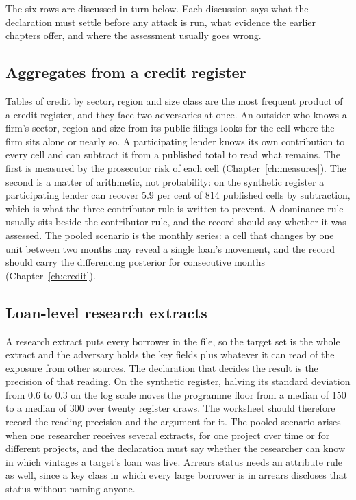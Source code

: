 The six rows are discussed in turn below. Each discussion says what the declaration
must settle before any attack is run, what evidence the earlier chapters offer, and
where the assessment usually goes wrong.

\subsection*{Aggregates from a credit register}

Tables of credit by sector, region and size class are the most frequent product of a
credit register, and they face two adversaries at once. An outsider who knows a
firm's sector, region and size from its public filings looks for the cell where the
firm sits alone or nearly so. A participating lender knows its own contribution to
every cell and can subtract it from a published total to read what remains. The
first is measured by the prosecutor risk of each cell (Chapter~\ref{ch:measures}). The
second is a matter of arithmetic, not probability: on the synthetic register a
participating lender can recover 5.9 per cent of 814 published cells by subtraction,
which is what the three-contributor rule is written to prevent. A dominance rule
usually sits beside the contributor rule, and the record should say whether it was
assessed. The pooled scenario is the monthly series: a cell that changes by one unit
between two months may reveal a single loan's movement, and the record should carry
the differencing posterior for consecutive months (Chapter~\ref{ch:credit}).

\subsection*{Loan-level research extracts}

A research extract puts every borrower in the file, so the target set is the whole
extract and the adversary holds the key fields plus whatever it can read of the
exposure from other sources. The declaration that decides the result is the
precision of that reading. On the synthetic register, halving its standard deviation
from 0.6 to 0.3 on the log scale moves the programme floor from a median of 150 to a
median of 300 over twenty register draws.
The worksheet should therefore record the reading precision and the argument for it.
The pooled scenario arises when one researcher receives several extracts, for one
project over time or for different projects, and the declaration must say whether
the researcher can know in which vintages a target's loan was live. Arrears status
needs an attribute rule as well, since a key class in which every large borrower is
in arrears discloses that status without naming anyone.

